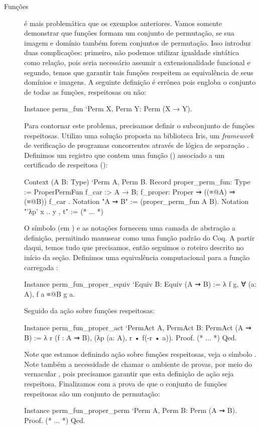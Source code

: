 \begin{description}
	\item[Funções] é mais problemática que os exemplos anteriores. Vamos somente demonstrar que funções formam um conjunto de permutação, se sua imagem e domínio também forem conjuntos de permutação. Isso introduz duas complicações: primeiro, não podemos utilizar igualdade sintática como relação, pois seria necessário assumir a extensionalidade funcional e segundo, temos que garantir tais funções respeitem as equivalência de seus domínios e imagens. A seguinte definição é errônea pois engloba o conjunto de todas as funções, respeitosas ou não:
	\begin{coqcode}
Instance perm_fun `{Perm X, Perm Y}: Perm (X → Y).
	\end{coqcode}
	Para contornar este problema, precisamos definir o subconjunto de funções respeitosas. Utilizo uma solução proposta na biblioteca Iris, um \textit{framework} de verificação de programas concorrentes através de lógica de separação \cite{Jung2015,Jung2016}. Definimos um registro que contem uma função () associado a um certificado de respeitosa ():
	\begin{coqcode}
Context (A B: Type) `{Perm A, Perm B}.
Record proper_perm_fun: Type := ProperPermFun {
   f_car :> A → B;
   f_proper: Proper ⇝ ((≡@{A}) ⇒ (≡@{B})) f_car
}.
Notation "A ⇝ B" := (proper_perm_fun A B).
Notation "'λp' x .. y , t" := (* ... *)
	\end{coqcode}
	O símbolo \coqinline{:>} (em ) e as notações fornecem uma camada de abstração a definição, permitindo manusear  como uma função padrão do Coq. A partir daqui, temos tudo que precisamos, então seguimos o roteiro descrito no início da seção. Definimos uma equivalência computacional para a função carregada :
	\begin{coqcode}
Instance perm_fun_proper_equiv `{Equiv B}: Equiv (A ⇝ B) := 
   λ f g, ∀ (a: A), f a ≡@{B} g a.
	\end{coqcode}
	Seguido da ação sobre funções respeitosas:
	\begin{coqcode}
Instance perm_fun_proper_act `{PermAct A, PermAct B}: PermAct (A ⇝ B) :=
   λ r (f : A ⇝ B), (λp (a: A), r • f(-r • a)).
Proof. (* ... *) Qed.
	\end{coqcode}
	Note que estamos definindo ação sobre funções respeitosas, veja o símbolo . Note também a necessidade de chamar o ambiente de provas, por meio do vernacular , pois precisamos garantir que esta definição de ação seja respeitosa. Finalizamos com a prova de que o conjunto de funções respeitosas são um conjunto de permutação:
	\begin{coqcode}
Instance perm_fun_proper_perm `{Perm A, Perm B}: Perm (A ⇝ B).
Proof. (* ... *) Qed.
	\end{coqcode}
\end{description}
